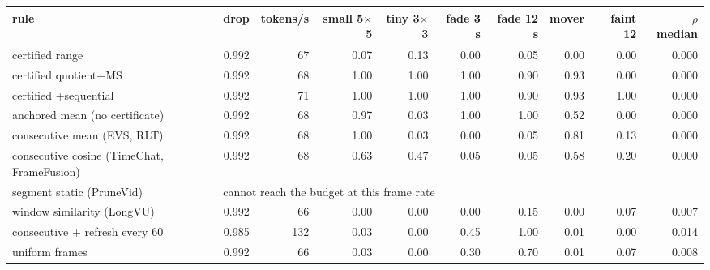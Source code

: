 \begin{tabular}{lrrrrrrrrr}
\toprule
rule & drop & tokens/s & small 5$\times$5 & tiny 3$\times$3 & fade 3 s & fade 12 s & mover & faint 12 & $\rho$ median \\
\midrule
certified range & 0.992 & 67 & 0.07 & 0.13 & 0.00 & 0.05 & 0.00 & 0.00 & 0.000 \\
certified quotient+MS & 0.992 & 68 & 1.00 & 1.00 & 1.00 & 0.90 & 0.93 & 0.00 & 0.000 \\
certified +sequential & 0.992 & 71 & 1.00 & 1.00 & 1.00 & 0.90 & 0.93 & 1.00 & 0.000 \\
anchored mean (no certificate) & 0.992 & 68 & 0.97 & 0.03 & 1.00 & 1.00 & 0.52 & 0.00 & 0.000 \\
consecutive mean (EVS, RLT) & 0.992 & 68 & 1.00 & 0.03 & 0.00 & 0.05 & 0.81 & 0.13 & 0.000 \\
consecutive cosine (TimeChat, FrameFusion) & 0.992 & 68 & 0.63 & 0.47 & 0.05 & 0.05 & 0.58 & 0.20 & 0.000 \\
segment static (PruneVid) & \multicolumn{9}{l}{cannot reach the budget at this frame rate} \\
window similarity (LongVU) & 0.992 & 66 & 0.00 & 0.00 & 0.00 & 0.15 & 0.00 & 0.07 & 0.007 \\
consecutive + refresh every 60 & 0.985 & 132 & 0.03 & 0.00 & 0.45 & 1.00 & 0.01 & 0.00 & 0.014 \\
uniform frames & 0.992 & 66 & 0.03 & 0.00 & 0.30 & 0.70 & 0.01 & 0.07 & 0.008 \\
\bottomrule
\end{tabular}
